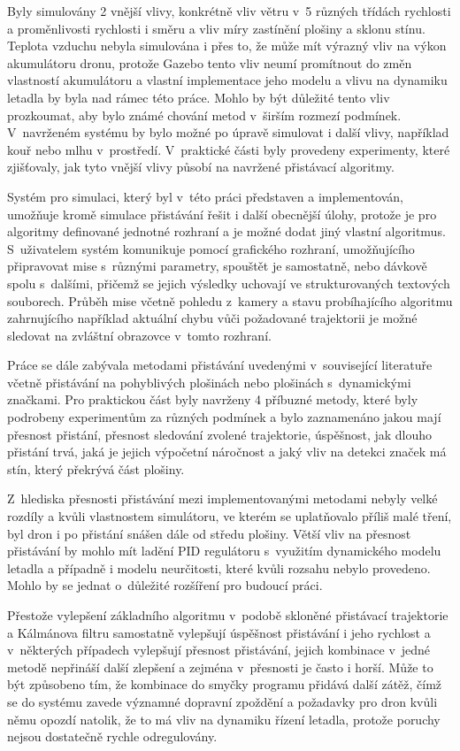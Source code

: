 Byly simulovány 2 vnější vlivy, konkrétně vliv větru v~5 různých třídách rychlosti a proměnlivosti rychlosti i směru a vliv míry zastínění plošiny a sklonu stínu. Teplota vzduchu nebyla simulována i přes to, že může mít výrazný vliv na výkon akumulátoru dronu, protože Gazebo tento vliv neumí promítnout do změn vlastností akumulátoru a vlastní implementace jeho modelu a vlivu na dynamiku letadla by byla nad rámec této práce. Mohlo by být důležité tento vliv prozkoumat, aby bylo známé chování metod v~širším rozmezí podmínek. V~navrženém systému by bylo možné po úpravě simulovat i další vlivy, například kouř nebo mlhu v~prostředí. V~praktické části byly provedeny experimenty, které zjišťovaly, jak tyto vnější vlivy působí na navržené přistávací algoritmy.

Systém pro simulaci, který byl v~této práci představen a implementován, umožňuje kromě simulace přistávání řešit i další obecnější úlohy, protože je pro algoritmy definované jednotné rozhraní a je možné dodat jiný vlastní algoritmus. S~uživatelem systém komunikuje pomocí grafického rozhraní, umožňujícího připravovat mise s~různými parametry, spouštět je samostatně, nebo dávkově spolu s~dalšími, přičemž se jejich výsledky uchovají ve strukturovaných textových souborech. Průběh mise včetně pohledu z~kamery a stavu probíhajícího algoritmu zahrnujícího například aktuální chybu vůči požadované trajektorii je možné sledovat na zvláštní obrazovce v~tomto rozhraní.

Práce se dále zabývala metodami přistávání uvedenými v~související literatuře včetně přistávání na pohyblivých plošinách nebo plošinách s~dynamickými značkami. Pro praktickou část byly navrženy 4 příbuzné metody, které byly podrobeny experimentům za různých podmínek a bylo zaznamenáno jakou mají přesnost přistání, přesnost sledování zvolené trajektorie, úspěšnost, jak dlouho přistání trvá, jaká je jejich výpočetní náročnost a jaký vliv na detekci značek má stín, který překrývá část plošiny.

Z~hlediska přesnosti přistávání mezi implementovanými metodami nebyly velké rozdíly a kvůli vlastnostem simulátoru, ve kterém se uplatňovalo příliš malé tření, byl dron i po přistání snášen dále od středu plošiny. Větší vliv na přesnost přistávání by mohlo mít ladění PID regulátoru s~využitím dynamického modelu letadla a případně i modelu neurčitosti, které kvůli rozsahu nebylo provedeno. Mohlo by se jednat o~důležité rozšíření pro budoucí práci.

Přestože vylepšení základního algoritmu v~podobě skloněné přistávací trajektorie a Kálmánova filtru samostatně vylepšují úspěšnost přistávání i jeho rychlost a v~některých případech vylepšují přesnost přistávání, jejich kombinace v~jedné metodě nepřináší další zlepšení a zejména v~přesnosti je často i horší. Může to být způsobeno tím, že kombinace do smyčky programu přidává další zátěž, čímž se do systému zavede významné dopravní zpoždění a požadavky pro dron kvůli němu opozdí natolik, že to má vliv na dynamiku řízení letadla, protože poruchy nejsou dostatečně rychle odregulovány.

